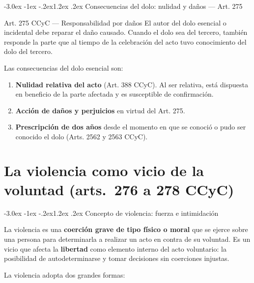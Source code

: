 \documentclass[12pt,oneside]{book}
\makeatletter
\renewcommand\section{\@startsection{section}{1}{\z@}%
  {-3.0ex \@plus -1ex \@minus -.2ex}{1.2ex \@plus .2ex}%
  {\normalfont\large\bfseries\color{acento}}}
\makeatother
\begin{document}
\section{Consecuencias del dolo: nulidad y daños --- Art. 275}

\begin{articulo}{Art. 275 CCyC --- Responsabilidad por daños}
El autor del dolo esencial o incidental debe reparar el daño causado. Cuando el dolo sea del tercero, también responde la parte que al tiempo de la celebración del acto tuvo conocimiento del dolo del tercero.
\end{articulo}

Las consecuencias del dolo esencial son:

\begin{enumerate}
    \item \textbf{Nulidad relativa del acto} (Art. 388 CCyC). Al ser relativa, está dispuesta en beneficio de la parte afectada y es susceptible de confirmación.
    \item \textbf{Acción de daños y perjuicios} en virtud del Art. 275.
    \item \textbf{Prescripción de dos años} desde el momento en que se conoció o pudo ser conocido el dolo (Arts. 2562 y 2563 CCyC).
\end{enumerate}


\chapter{La violencia como vicio de la voluntad (arts.~276 a 278 CCyC)}

\section{Concepto de violencia: fuerza e intimidación}

La violencia es una \textbf{coerción grave de tipo físico o moral} que se ejerce sobre una persona para determinarla a realizar un acto en contra de su voluntad. Es un vicio que afecta la \textbf{libertad} como elemento interno del acto voluntario: la posibilidad de autodeterminarse y tomar decisiones sin coerciones injustas.

La violencia adopta dos grandes formas:
\end{document}
